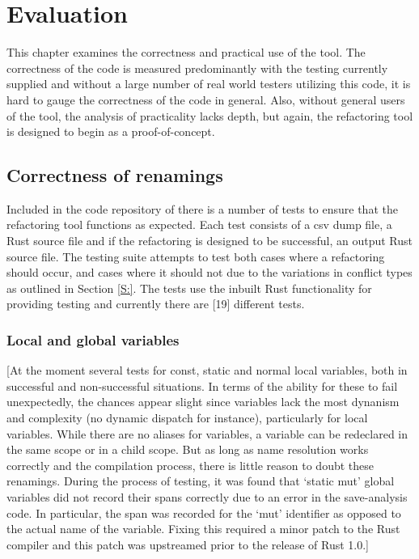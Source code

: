 \chapter{Evaluation}\label{C:eval}
This chapter examines the correctness and practical use of the tool. The correctness of the code is measured predominantly with the testing currently supplied and without a large number of real world testers utilizing this code, it is hard to gauge the correctness of the code in general. Also, without general users of the tool, the analysis of practicality lacks depth, but again, the refactoring tool is designed to begin as a proof-of-concept.


\section{Correctness of renamings}
Included in the code repository of there is a number of tests to ensure that the refactoring tool functions as expected. Each test consists of a csv dump file, a Rust source file and if the refactoring is designed to be successful, an output Rust source file. The testing suite attempts to test both cases where a refactoring should occur, and cases where it should not due to the variations in conflict types as outlined in Section \ref{S:}. The tests use the inbuilt Rust functionality for providing testing and currently there are [19] different tests.

\subsection{Local and global variables}
[At the moment several tests for const, static and normal local variables, both in successful and non-successful situations. In terms of the ability for these to fail unexpectedly, the chances appear slight since variables lack the most dynanism and complexity (no dynamic dispatch for instance), particularly for local variables. While there are no aliases for variables, a variable can be redeclared in the same scope or in a child scope. But as long as name resolution works correctly and the compilation process, there is little reason to doubt these renamings. During the process of testing, it was found that `static mut' global variables did not record their spans correctly due to an error in the save-analysis code. In particular, the span was recorded for the `mut' identifier as opposed to the actual name of the variable. Fixing this required a minor patch to the Rust compiler and this patch was upstreamed prior to the release of Rust 1.0.]

